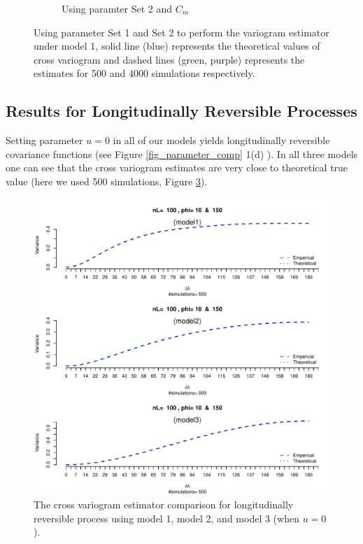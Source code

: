 \begin{figure}[H]
\begin{subfigure}{.5\textwidth}
		\caption{Using paramter Set 2 and $C_m$}
		\label{fig:sfig2}
	\end{subfigure}
	\caption[Using Parameter Set 1 and Set 2 to Perform The Variogram Estimator]{Using parameter Set 1 and Set 2 to perform the variogram estimator under model 1, solid line (blue) represents the theoretical values of cross variogram and dashed lines (green, purple) represents the estimates for 500 and 4000 simulations respectively. }
	\label{compare_varigram_sim_1}
\end{figure}


\subsection{Results for Longitudinally Reversible Processes}

Setting parameter $u = 0$ in all of our models yields longitudinally reversible covariance functions (see Figure \ref{fig_parameter_comp} 1(d) ). In all three models one can see that the cross variogram estimates are very close to theoretical true value (here we used 500 simulations, Figure \ref{logitudinal_comparison}).

\begin{figure}[H]
	\centering
	\includegraphics [scale =.9, keepaspectratio]{graphs/results_variogram_comparison}
	\caption[The Cross Variogram Estimator Comparison for Longitudinally Reversible]{The cross variogram estimator comparison for longitudinally reversible process using  model 1, model 2, and model 3 (when $u=0$).}
	\label{logitudinal_comparison}
\end{figure}

